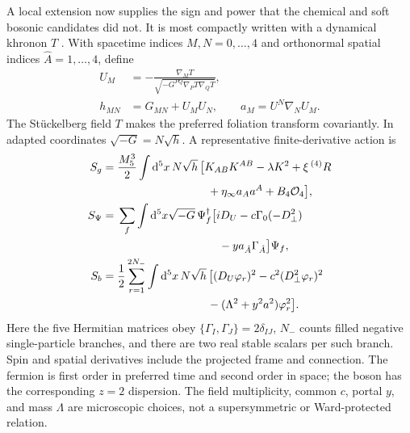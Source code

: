 \documentclass[10pt]{article}
\newcommand{\dd}{\mathrm{d}}
\begin{document}
A local extension now supplies the sign and power that the chemical and soft
bosonic candidates did not.  It is most compactly written with a dynamical
khronon $T$ \citep{Blas2010,DonnellyJacobson2011,BlanchetMarsat2011}.  With
spacetime indices $M,N=0,\ldots,4$ and orthonormal spatial
indices $\hat A=1,\ldots,4$, define
\begin{equation}
 \begin{aligned}
 U_M&=-\frac{\nabla_MT}{\sqrt{-G^{PQ}\nabla_PT\nabla_QT}},\\
 h_{MN}&=G_{MN}+U_MU_N,\qquad a_M=U^N\nabla_NU_M .
 \end{aligned}
 \label{eq:khronongeometry}
\end{equation}
The Stückelberg field $T$ makes the preferred foliation transform covariantly.
In adapted coordinates $\sqrt{-G}=N\sqrt h$.  A representative finite-derivative
action is
\begin{equation}
 \begin{aligned}
 S_g={}&\frac{M_5^3}{2}\int\dd^5x\,N\sqrt h\,\bigl[
 K_{AB}K^{AB}-\lambda K^2+\xi\,{}^{(4)}R\\
 &\hspace{8em}+\eta_\infty a_Aa^A+B_4{\cal O}_4\bigr],\\
 S_\Psi={}&\sum_f\int\dd^5x\sqrt{-G}\,\Psi_f^\dagger
 \bigl[iD_U-c\Gamma_0(-D_\perp^2)\\
 &\hspace{9em}-y a_{\hat A}\Gamma_{\hat A}\bigr]\Psi_f,\\
 S_b={}&\frac12\sum_{r=1}^{2N_-}\int\dd^5x\,N\sqrt h\,\bigl[
 (D_U\varphi_r)^2-c^2(D_\perp^2\varphi_r)^2\\
 &\hspace{8em}-(\Lambda^2+y^2a^2)\varphi_r^2\bigr].
 \end{aligned}
 \label{eq:localz2action}
\end{equation}
Here the five Hermitian matrices obey
$\{\Gamma_I,\Gamma_J\}=2\delta_{IJ}$, $N_-$ counts filled negative
single-particle branches, and there are two real stable scalars per such
branch.  Spin and spatial derivatives include the projected frame and
connection.  The fermion is first order in preferred time and second order in
space; the boson has the corresponding $z=2$ dispersion.  The field
multiplicity, common $c$, portal $y$, and mass $\Lambda$ are microscopic choices,
not a supersymmetric or Ward-protected relation.
\end{document}
